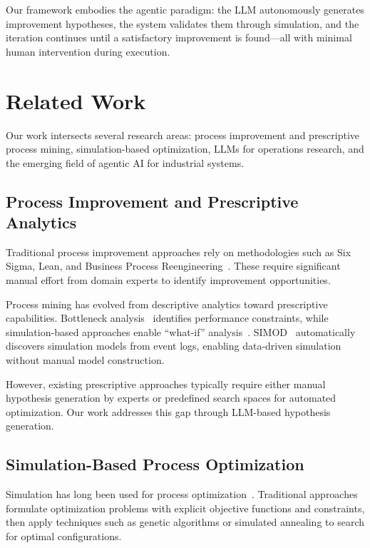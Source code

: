 \documentclass[preprint,12pt]{elsarticle}
\begin{document}
Our framework embodies the agentic paradigm: the LLM autonomously generates improvement hypotheses, the system validates them through simulation, and the iteration continues until a satisfactory improvement is found---all with minimal human intervention during execution.

\section{Related Work}
\label{sec:related}

Our work intersects several research areas: process improvement and prescriptive process mining, simulation-based optimization, LLMs for operations research, and the emerging field of agentic AI for industrial systems.

\subsection{Process Improvement and Prescriptive Analytics}

Traditional process improvement approaches rely on methodologies such as Six Sigma, Lean, and Business Process Reengineering~\cite{dumas2018fundamentals}. These require significant manual effort from domain experts to identify improvement opportunities.

Process mining has evolved from descriptive analytics toward prescriptive capabilities. Bottleneck analysis~\cite{denisov2018predictive} identifies performance constraints, while simulation-based approaches enable ``what-if'' analysis~\cite{camargo2020automated}. SIMOD~\cite{camargo2020automated} automatically discovers simulation models from event logs, enabling data-driven simulation without manual model construction.

However, existing prescriptive approaches typically require either manual hypothesis generation by experts or predefined search spaces for automated optimization. Our work addresses this gap through LLM-based hypothesis generation.

\subsection{Simulation-Based Process Optimization}

Simulation has long been used for process optimization~\cite{law2015simulation}. Traditional approaches formulate optimization problems with explicit objective functions and constraints, then apply techniques such as genetic algorithms or simulated annealing to search for optimal configurations.
\end{document}
